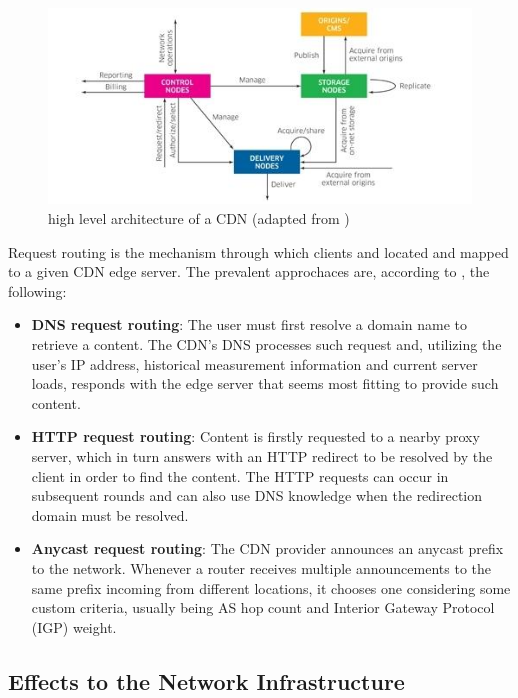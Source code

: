 \begin{figure}[!h]
\centering
\includegraphics[scale=8.0]{img/cdn-architecture.jpg}
\caption{high level architecture of a CDN (adapted from \cite{global-dots})}
\label{fig:cdn-architecture}
\end{figure}

    Request routing is the mechanism through which clients and located and mapped to a given CDN edge server.
    The prevalent approchaces are, according to \cite{wichtlhuber2017}, the following:

\begin{itemize}
    \item \textbf{DNS request routing}: The user must first resolve a domain name to retrieve a content. The CDN's DNS processes such request and, utilizing the user's IP address, historical measurement information and current server loads, responds with the edge server that seems most fitting to provide such content.
    \item \textbf{HTTP request routing}: Content is firstly requested to a nearby proxy server, which in turn answers with an HTTP redirect to be resolved by the client in order to find the content. The HTTP requests can occur in subsequent rounds and can also use DNS knowledge when the redirection domain must be resolved.
    \item \textbf{Anycast request routing}: The CDN provider announces an anycast prefix to the network. Whenever a router receives multiple announcements to the same prefix incoming from different locations, it chooses one considering some custom criteria, usually being AS hop count and Interior Gateway Protocol (IGP) weight.
\end{itemize}{}

\subsection{Effects to the Network Infrastructure}

